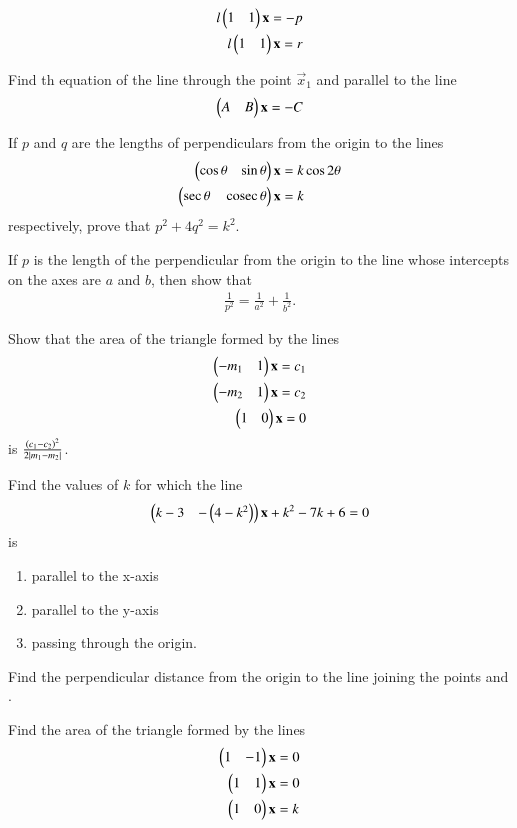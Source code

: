 %
\begin{align}
l\begin{pmatrix}1 & 1\end{pmatrix}\mathbf{x} = -p
\\
l\begin{pmatrix}1 & 1\end{pmatrix}\mathbf{x} = r
\end{align}
%
\item Find th equation of the line through the point $\vec{x}_1$ and parallel to the line
%
\begin{align}
\begin{pmatrix}A & B\end{pmatrix}\mathbf{x} = -C
\end{align}
%
\item If $p$ and $q$ are the lengths of perpendiculars from the origin to the lines 
%
\begin{align}
\begin{pmatrix}\cos\theta & \sin\theta\end{pmatrix}\mathbf{x} &= k\cos2\theta
\\
\begin{pmatrix}\sec\theta & \,\text{cosec}\,\theta\end{pmatrix}\mathbf{x} &= k
\end{align}
%
respectively, prove that $p^2+4q^2=k^2$.
\item If $p$ is the length of the perpendicular from the origin to the line whose intercepts on the axes are $a$ and $b$, then show that 
%
\begin{align}
\frac{1}{p^2} = \frac{1}{a^2}+\frac{1}{b^2}.
\end{align}
%
\item Show that the area of the triangle formed by the lines
%
\begin{align}
\begin{pmatrix}-m_1 & 1\end{pmatrix}\mathbf{x} = c_1
\\
\begin{pmatrix}-m_2 & 1\end{pmatrix}\mathbf{x} = c_2
\\
\begin{pmatrix}1 & 0\end{pmatrix}\mathbf{x} = 0
\end{align}
%
is $\frac{\left(c_1-c_2\right)^2}{2\left\vert m_1-m_2\right\vert}$.
\item Find the values of $k$ for which the line 
%
\begin{align}
\begin{pmatrix}k-3 & -\left(4-k^2\right)\end{pmatrix}\mathbf{x} +k^2-7k+6= 0
\end{align}
%
is
\begin{enumerate}
\item parallel to the x-axis
\item parallel to the y-axis
\item passing through the origin.
\end{enumerate}
%
\item Find the perpendicular distance from the origin to the line joining the points \myvec{\cos\theta\sin\theta} and \myvec{\cos\phi \sin \phi}.
\item Find the area of the triangle formed by the lines
%
\begin{align}
\begin{pmatrix}1 & -1\end{pmatrix}\mathbf{x} &= 0
\\
\begin{pmatrix}1 & 1\end{pmatrix}\mathbf{x} &= 0
\\
\begin{pmatrix}1 & 0\end{pmatrix}\mathbf{x} &= k
\end{align}
